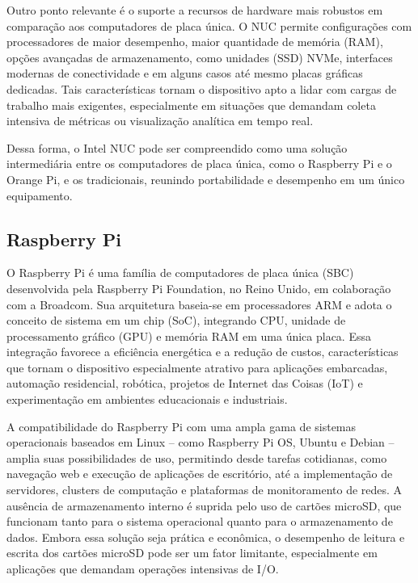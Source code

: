 Outro ponto relevante é o suporte a recursos de hardware mais robustos em comparação aos computadores de placa única. O NUC permite configurações com processadores de maior desempenho, maior quantidade de memória  (RAM), opções avançadas de armazenamento, como unidades  (SSD) NVMe, interfaces modernas de conectividade e em alguns casos até mesmo placas gráficas dedicadas. Tais características tornam o dispositivo apto a lidar com cargas de trabalho mais exigentes, especialmente em situações que demandam coleta intensiva de métricas ou visualização analítica em tempo real.

Dessa forma, o Intel NUC pode ser compreendido como uma solução intermediária entre os computadores de placa única, como o Raspberry Pi e o Orange Pi, e os  tradicionais, reunindo portabilidade e desempenho em um único equipamento.

\subsection{Raspberry Pi}
\label{subsection:RaspberryPi}

O Raspberry Pi \citep{raspihw2025} é uma família de computadores de placa única (SBC) desenvolvida pela Raspberry Pi Foundation, no Reino Unido, em colaboração com a Broadcom. Sua arquitetura baseia-se em processadores ARM e adota o conceito de sistema em um chip (SoC), integrando CPU, unidade de processamento gráfico (GPU) e memória RAM em uma única placa. Essa integração favorece a eficiência energética e a redução de custos, características que tornam o dispositivo especialmente atrativo para aplicações embarcadas, automação residencial, robótica, projetos de Internet das Coisas (IoT) e experimentação em ambientes educacionais e industriais.

A compatibilidade do Raspberry Pi com uma ampla gama de sistemas operacionais baseados em Linux -- como Raspberry Pi OS, Ubuntu e Debian -- amplia suas possibilidades de uso, permitindo desde tarefas cotidianas, como navegação web e execução de aplicações de escritório, até a implementação de servidores, clusters de computação e plataformas de monitoramento de redes. A ausência de armazenamento interno é suprida pelo uso de cartões microSD, que funcionam tanto para o sistema operacional quanto para o armazenamento de dados. Embora essa solução seja prática e econômica, o desempenho de leitura e escrita dos cartões microSD pode ser um fator limitante, especialmente em aplicações que demandam operações intensivas de I/O.

